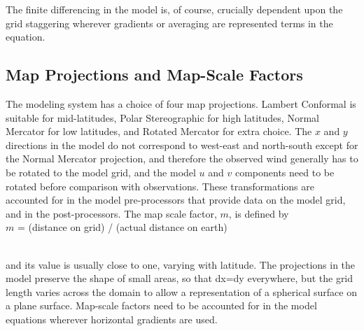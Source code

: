 The finite differencing in the model is, of course, crucially dependent upon the grid 
staggering wherever gradients or averaging are represented terms in the equation.

\subsection{Map Projections and Map-Scale Factors}
The modeling system has a choice of four map projections. Lambert Conformal is 
suitable for mid-latitudes, Polar Stereographic for high latitudes, Normal Mercator for 
low latitudes, and Rotated Mercator for extra choice. The $x$ and $y$ directions in the model do not correspond to west-east and north-south except for the Normal Mercator projection, and therefore the observed wind generally has to be rotated to the model grid, and the model $u$ and $v$ components need to be rotated before comparison with observations. These transformations are 
accounted for in the model pre-processors that provide data on the model grid, and in the post-processors.  The map scale factor, $m$, is defined by \\

$m$ = (distance on grid) / (actual distance on earth)

\noindent \\
and its value is usually close to one, varying with latitude. The projections in the model preserve the shape of small areas, so that dx=dy everywhere, but the grid length varies across the domain to allow a representation of a spherical surface on a plane surface. Map-scale factors need to be accounted for in the model equations wherever horizontal gradients are used.


